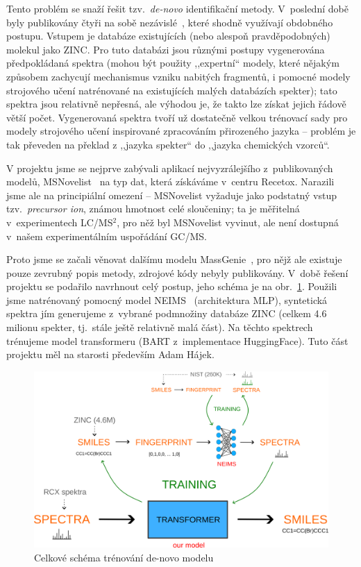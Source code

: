 \documentclass[a4paper,11pt]{article}
\begin{document}
Tento problém se snaží řešit tzv.\ \emph{de-novo} identifikační metody.
V~poslední době byly publikovány čtyři na sobě nezávislé~\cite{msnovelist, massgenie, vaems, spec2mol},
které shodně využívají obdobného postupu.
Vstupem je databáze existujících (nebo alespoň pravděpodobných) molekul jako ZINC.
Pro tuto databázi jsou různými postupy vygenerována předpokládaná spektra (mohou být použity ,,expertní`` modely,
které nějakým způsobem zachycují mechanismus vzniku nabitých fragmentů, i pomocné modely strojového učení
natrénované na existujících malých databázích spekter); 
tato spektra jsou relativně nepřesná, ale výhodou je, že takto lze získat jejich řádově větší počet.
Vygenerovaná spektra tvoří už dostatečně velkou trénovací sady pro modely strojového učení inspirované
zpracováním přirozeného jazyka -- problém je tak převeden na překlad z ,,jazyka spekter`` do ,,jazyka chemických vzorců``.

V projektu jsme se nejprve zabývali aplikací nejvyzrálejšího z~publikovaných modelů, MSNovelist~\cite{msnovelist}
na typ dat, která získáváme v~centru Recetox.
Narazili jsme ale na principiální omezení -- MSNovelist vyžaduje jako podstatný vstup tzv.~\emph{precursor ion},
známou hmotnost celé sloučeniny; ta je měřitelná v~experimentech LC/MS$^2$, pro něž byl MSNovelist vyvinut,
ale není dostupná v~našem experimentálním uspořádání GC/MS.

Proto jsme se začali věnovat dalšímu modelu MassGenie~\cite{massgenie}, pro nějž ale existuje pouze
zevrubný popis metody, zdrojové kódy nebyly publikovány.
V~době řešení projektu se podařilo navrhnout celý postup,
jeho schéma je na obr.~\ref{f:denovo}.
Použili jsme natrénovaný pomocný model NEIMS~\cite{neims} (architektura MLP),
syntetická spektra jím generujeme z~vybrané podmnožiny databáze ZINC (celkem 4.6 milionu spekter,
tj.\ stále ještě relativně malá část).
Na těchto spektrech trénujeme model transformeru (BART z~implementace HuggingFace).
Tuto část projektu měl na starosti především Adam Hájek.



\begin{figure}
\begin{center}
\includegraphics[width=.8\hsize]{diagram_whole}
\caption{Celkové schéma trénování de-novo modelu}
\label{f:denovo}
\end{center}
\end{figure}
\end{document}
